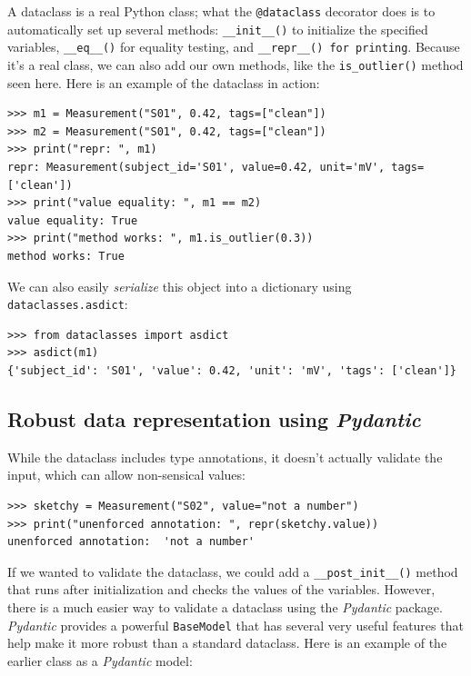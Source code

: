 A dataclass is a real Python class; what the \texttt{@dataclass} decorator does is to automatically set up several methods: \texttt{\_\_init\_\_()} to initialize the specified variables, \texttt{\_\_eq\_\_()} for equality testing, and \texttt{\_\_repr\_\_() for printing}.  Because it's a real class, we can also add our own methods, like the \texttt{is\_outlier()} method seen here.  Here is an example of the dataclass in action:

\begin{lstlisting}[style=repl]
>>> m1 = Measurement("S01", 0.42, tags=["clean"])
>>> m2 = Measurement("S01", 0.42, tags=["clean"])
>>> print("repr: ", m1) 
repr: Measurement(subject_id='S01', value=0.42, unit='mV', tags=['clean'])
>>> print("value equality: ", m1 == m2) 
value equality: True
>>> print("method works: ", m1.is_outlier(0.3))
method works: True
\end{lstlisting}

We can also easily \textit{serialize} this object into a dictionary using \texttt{dataclasses.asdict}:

\begin{lstlisting}[style=replshort]
>>> from dataclasses import asdict
>>> asdict(m1)
{'subject_id': 'S01', 'value': 0.42, 'unit': 'mV', 'tags': ['clean']}
\end{lstlisting}

\subsection{Robust data representation using \textit{Pydantic}}

While the dataclass includes type annotations, it doesn't actually validate the input, which can allow non-sensical values:

\begin{lstlisting}[style=replshort]
>>> sketchy = Measurement("S02", value="not a number") 
>>> print("unenforced annotation: ", repr(sketchy.value))
unenforced annotation:  'not a number'
\end{lstlisting}

If we wanted to validate the dataclass, we could add a \texttt{\_\_post\_init\_\_()} method that runs after initialization and checks the values of the variables.  However, there is a much easier way to validate a dataclass using the \textit{Pydantic} package.  \textit{Pydantic} provides a powerful \texttt{BaseModel} that has several very useful features that help make it more robust than a standard dataclass.  Here is an example of the earlier class as a \textit{Pydantic} model:

